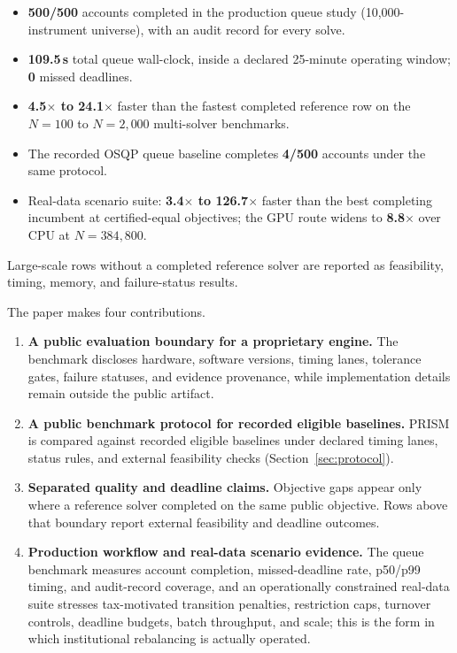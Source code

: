 \documentclass[10pt,a4paper]{extarticle}
\begin{document}
\begin{keyresult}
\begin{itemize}[leftmargin=1.5em, itemsep=1.5pt]
  \item \textbf{500/500} accounts completed in the production queue study
        (10,000-instrument universe), with an audit record for every solve.
  \item \textbf{109.5\,s} total queue wall-clock, inside a declared
        25-minute operating window; \textbf{0} missed deadlines.
  \item \textbf{4.5$\times$ to 24.1$\times$} faster than the fastest completed
        reference row on the $N{=}100$ to $N{=}2{,}000$ multi-solver
        benchmarks.
  \item The recorded OSQP queue baseline completes \textbf{4/500} accounts
        under the same protocol.
  \item Real-data scenario suite: \textbf{3.4$\times$ to 126.7$\times$}
        faster than the best completing incumbent at certified-equal
        objectives; the GPU route widens to \textbf{8.8$\times$} over CPU
        at $N{=}384{,}800$.
\end{itemize}
Large-scale rows without a completed reference solver are reported as
feasibility, timing, memory, and failure-status results.
\end{keyresult}

The paper makes four contributions.

\begin{enumerate}[label=\textbf{C\arabic*.}, leftmargin=2.4em]
  \item \textbf{A public evaluation boundary for a proprietary engine.}
        The benchmark discloses hardware, software versions, timing lanes,
        tolerance gates, failure statuses, and evidence provenance, while
        implementation details remain outside the public artifact.

  \item \textbf{A public benchmark protocol for recorded eligible baselines.}
        PRISM is compared against recorded eligible baselines under declared
        timing lanes, status rules, and external feasibility checks
        (Section~\ref{sec:protocol}).

  \item \textbf{Separated quality and deadline claims.}
        Objective gaps appear only where a reference solver completed on the
        same public objective. Rows above that boundary report external
        feasibility and deadline outcomes.

  \item \textbf{Production workflow and real-data scenario evidence.}
        The queue benchmark measures account completion, missed-deadline rate,
        p50/p99 timing, and audit-record coverage, and an operationally
        constrained real-data suite stresses tax-motivated transition
        penalties, restriction caps, turnover controls, deadline budgets,
        batch throughput, and scale; this is the form in which institutional
        rebalancing is actually operated.
\end{enumerate}
\end{document}
